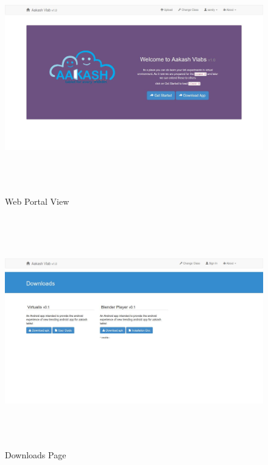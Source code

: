 \documentclass[12pt]{report}
\begin{document}
\begin{figure}[H]
 \centering 
 \includegraphics[width=15cm, height=10cm]{./301.jpg}
 \caption{Web Portal View \label{fig:301}}
\end{figure}
\begin{figure}[H]
 \centering 
 \includegraphics[width=15cm, height=10cm]{./302.jpg}
 \caption{Downloads Page\label{fig:302}}
\end{figure}
\end{document}

